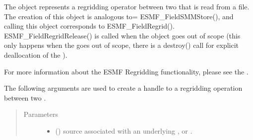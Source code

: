 \documentclass[letterpaper,10pt,english]{sphinxmanual}
\begin{document}
\begin{fulllineitems}
\label{\detokenize{regridfromfile:ESMF.api.regrid.RegridFromFile}}
The {\hyperref[\detokenize{regridfromfile:ESMF.api.regrid.RegridFromFile}]{}} object represents a regridding
operator between two {\hyperref[\detokenize{field:ESMF.api.field.Field}]{}} that is read
from a file. The creation of this object is analogous to= ESMF\_FieldSMMStore(),
and calling this object corresponds to ESMF\_FieldRegrid(). ESMF\_FieldRegridRelease()
is called when the {\hyperref[\detokenize{regridfromfile:ESMF.api.regrid.RegridFromFile}]{}} object goes
out of scope (this only happens when the {\hyperref[\detokenize{manager:ESMF.api.esmpymanager.Manager}]{}}
goes out of scope, there is a destroy() call for explicit deallocation of
the {\hyperref[\detokenize{regridfromfile:ESMF.api.regrid.RegridFromFile}]{}}).

For more information about the ESMF Regridding functionality, please see
the .

The following arguments are used to create a handle to a regridding
operation between two {\hyperref[\detokenize{field:ESMF.api.field.Field}]{}}.

\begin{quote}\begin{description}
\item[{Parameters}] \leavevmode\begin{itemize}
\item {} 
 ({\hyperref[\detokenize{field:ESMF.api.field.Field}]{}}) \textendash{} source {\hyperref[\detokenize{field:ESMF.api.field.Field}]{}} associated
with an underlying {\hyperref[\detokenize{grid:ESMF.api.grid.Grid}]{}}, {\hyperref[\detokenize{mesh:ESMF.api.mesh.Mesh}]{}}
or {\hyperref[\detokenize{locstream:ESMF.api.locstream.LocStream}]{}}.


\end{itemize}
\end{description}
\end{quote}
\end{fulllineitems}
\end{document}
